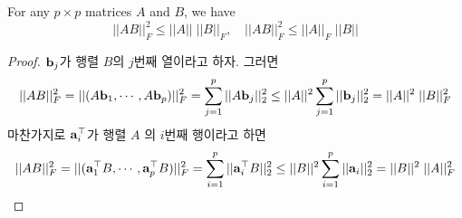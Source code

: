 
  \begin{lemma}
  For any $p \times p$ matrices $A$ and $B$, we have
  \[
  ||AB||_F^2 \leq ||A|| \; ||B||_F, \quad ||AB||_F^2 \leq ||A||_F \; ||B||
  \]
  \end{lemma}
  \begin{proof}
    $\vectorbold{b}_j$가 행렬 $B$의 $j$번째 열이라고 하자. 그러면
    \begin{align*}
      ||AB||_F^2 = ||(A\vectorbold{b}_1, \cdots, A\vectorbold{b}_p)||_F^2 = \sum_{j=1}^{p} ||A\vectorbold{b}_j||_2^2 \leq ||A||^2 \sum_{j=1}^{p}||\vectorbold{b}_j||_2^2 = ||A||^2 \; ||B||_F^2
    \end{align*}
    마찬가지로 $\vectorbold{a}_i^\top$가 행렬 $A$ 의 $i$번째 행이라고 하면
    \begin{align*}
      ||AB||_F^2 = ||(\vectorbold{a}_1^\top B, \cdots, \vectorbold{a}_p^\top B)||_F^2 = \sum_{i=1}^{p} ||\vectorbold{a}_i^\top B||_2^2 \leq ||B||^2 \sum_{i=1}^{p}||\vectorbold{a}_i||_2^2 = ||B||^2 \; ||A||_F^2
    \end{align*}
  \end{proof}
